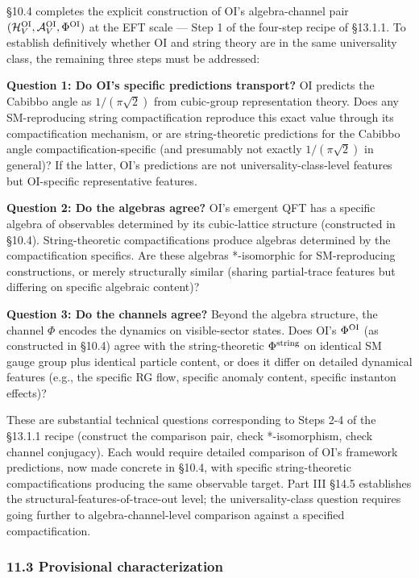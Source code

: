 \documentclass[
]{article}
\begin{document}
§10.4 completes the explicit construction of OI's algebra-channel pair
\((\mathcal{H}_V^{\rm OI}, \mathcal{A}_V^{\rm OI}, \Phi^{\rm OI})\) at
the EFT scale --- Step 1 of the four-step recipe of §13.1.1. To
establish definitively whether OI and string theory are in the same
universality class, the remaining three steps must be addressed:

\textbf{Question 1: Do OI's specific predictions transport?} OI predicts
the Cabibbo angle as \(1/(\pi\sqrt{2})\) from cubic-group representation
theory. Does any SM-reproducing string compactification reproduce this
exact value through its compactification mechanism, or are
string-theoretic predictions for the Cabibbo angle
compactification-specific (and presumably not exactly
\(1/(\pi\sqrt{2})\) in general)? If the latter, OI's predictions are not
universality-class-level features but OI-specific representative
features.

\textbf{Question 2: Do the algebras agree?} OI's emergent QFT has a
specific algebra of observables determined by its cubic-lattice
structure (constructed in §10.4). String-theoretic compactifications
produce algebras determined by the compactification specifics. Are these
algebras *-isomorphic for SM-reproducing constructions, or merely
structurally similar (sharing partial-trace features but differing on
specific algebraic content)?

\textbf{Question 3: Do the channels agree?} Beyond the algebra
structure, the channel \(\Phi\) encodes the dynamics on visible-sector
states. Does OI's \(\Phi^{\rm OI}\) (as constructed in §10.4) agree with
the string-theoretic \(\Phi^{\rm string}\) on identical SM gauge group
plus identical particle content, or does it differ on detailed dynamical
features (e.g., the specific RG flow, specific anomaly content, specific
instanton effects)?

These are substantial technical questions corresponding to Steps 2-4 of
the §13.1.1 recipe (construct the comparison pair, check *-isomorphism,
check channel conjugacy). Each would require detailed comparison of OI's
framework predictions, now made concrete in §10.4, with specific
string-theoretic compactifications producing the same observable target.
Part III §14.5 establishes the structural-features-of-trace-out level;
the universality-class question requires going further to
algebra-channel-level comparison against a specified compactification.

\hypertarget{provisional-characterization}{%
\subsubsection{11.3 Provisional
characterization}\label{provisional-characterization}}
\end{document}
